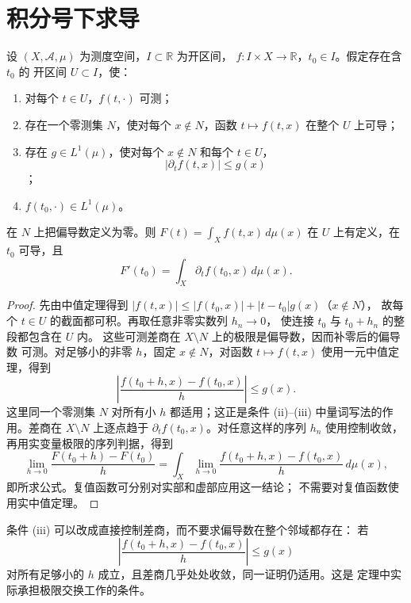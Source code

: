 \section{积分号下求导}

\begin{theorem}[积分号下求导]
\label{thm:differentiation-under-integral}
设 \((X,\mathcal A,\mu)\) 为测度空间，\(I\subset\mathbb R\) 为开区间，
\(f:I\times X\to\mathbb R\)，\(t_0\in I\)。假定存在含 \(t_0\) 的
开区间 \(U\subset I\)，使：
\begin{enumerate}[label=\textup{(\roman*)}]
 \item 对每个 \(t\in U\)，\(f(t,\cdot)\) 可测；
 \item 存在一个零测集 \(N\)，使对每个 \(x\notin N\)，函数
 \(t\mapsto f(t,x)\) 在整个 \(U\) 上可导；
 \item 存在 \(g\in L^1(\mu)\)，使对每个 \(x\notin N\) 和每个 \(t\in U\)，
 \[
  |\partial_tf(t,x)|\le g(x)
 \]；
 \item \(f(t_0,\cdot)\in L^1(\mu)\)。
\end{enumerate}
在 \(N\) 上把偏导数定义为零。则 \(F(t)=\int_Xf(t,x)\,d\mu(x)\)
在 \(U\) 上有定义，在 \(t_0\) 可导，且
\[
 F'(t_0)=\int_X\partial_tf(t_0,x)\,d\mu(x).
\]
\end{theorem}

\begin{proof}
先由中值定理得到
\(|f(t,x)|\le |f(t_0,x)|+|t-t_0|g(x)\)（\(x\notin N\)），
故每个 \(t\in U\) 的截面都可积。再取任意非零实数列 \(h_n\to0\)，
使连接 \(t_0\) 与 \(t_0+h_n\) 的整段都包含在 \(U\) 内。
这些可测差商在 \(X\setminus N\) 上的极限是偏导数，因而补零后的偏导数
可测。对足够小的非零 \(h\)，固定
\(x\notin N\)，对函数 \(t\mapsto f(t,x)\) 使用一元中值定理，得到
\[
 \left|\frac{f(t_0+h,x)-f(t_0,x)}{h}\right|\le g(x).
\]
这里同一个零测集 \(N\) 对所有小 \(h\) 都适用；这正是条件 (ii)--(iii)
中量词写法的作用。差商在 \(X\setminus N\) 上逐点趋于
\(\partial_tf(t_0,x)\)。对任意这样的序列 \(h_n\) 使用控制收敛，
再用实变量极限的序列判据，得到
\[
 \lim_{h\to0}\frac{F(t_0+h)-F(t_0)}h
 =\int_X\lim_{h\to0}
 \frac{f(t_0+h,x)-f(t_0,x)}h\,d\mu(x),
\]
即所求公式。复值函数可分别对实部和虚部应用这一结论；
不需要对复值函数使用实中值定理。
\end{proof}

\begin{remark}
条件 (iii) 可以改成直接控制差商，而不要求偏导数在整个邻域都存在：
若
\[
 \left|\frac{f(t_0+h,x)-f(t_0,x)}h\right|\le g(x)
\]
对所有足够小的 \(h\) 成立，且差商几乎处处收敛，同一证明仍适用。这是
定理中实际承担极限交换工作的条件。
\end{remark}

